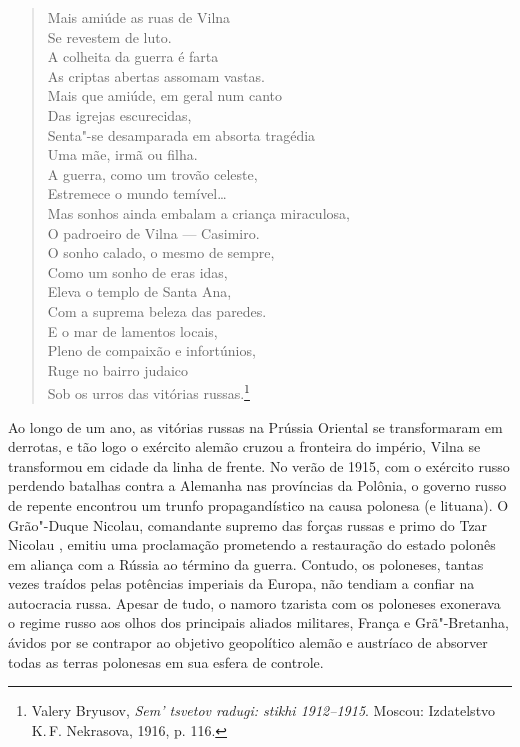 %

\pagebreak

\begin{verse}
Mais amiúde as ruas de Vilna\\
Se revestem de luto.\\
A colheita da guerra é farta\\
As criptas abertas assomam vastas.\\[10pt]
Mais que amiúde, em geral num canto\\
Das igrejas escurecidas,\\
Senta"-se desamparada em absorta tragédia\\
Uma mãe, irmã ou filha.\\[10pt]
A guerra, como um trovão celeste,\\
Estremece o mundo temível\ldots{}\\
Mas sonhos ainda embalam a criança miraculosa,\\
O padroeiro de Vilna --- Casimiro.\\[10pt]
O sonho calado, o mesmo de sempre,\\
Como um sonho de eras idas,\\
Eleva o templo de Santa Ana,\\
Com a suprema beleza das paredes.\\[10pt]
E o mar de lamentos locais,\\
Pleno de compaixão e infortúnios,\\
Ruge no bairro judaico\\
Sob os urros das vitórias russas.\footnote{Valery Bryusov, \textit{Sem' tsvetov radugi: stikhi 1912--1915}. Moscou: Izdatelstvo K.\,F. Nekrasova, 1916, p. 116.}
\end{verse}

Ao longo de um ano, as vitórias russas na Prússia Oriental se
transformaram em derrotas, e tão logo o exército alemão cruzou a
fronteira do império, Vilna se transformou em cidade da linha de frente.
No verão de 1915, com o exército russo perdendo batalhas contra a
Alemanha nas províncias da Polônia, o governo russo de repente encontrou
um trunfo propagandístico na causa polonesa (e lituana). O Grão"-Duque
Nicolau, comandante supremo das forças russas e primo do Tzar Nicolau
, emitiu uma proclamação prometendo a restauração do estado polonês em
aliança com a Rússia ao término da guerra. Contudo, os poloneses, tantas
vezes traídos pelas potências imperiais da Europa, não tendiam a confiar
na autocracia russa. Apesar de tudo, o namoro tzarista com os poloneses
exonerava o regime russo aos olhos dos principais aliados militares,
França e Grã"-Bretanha, ávidos por se contrapor ao objetivo geopolítico
alemão e austríaco de absorver todas as terras polonesas em sua esfera
de controle.

